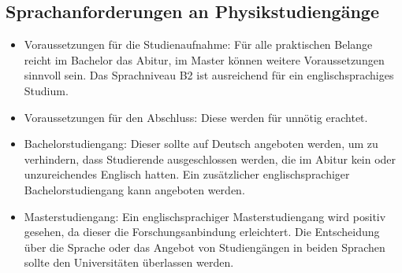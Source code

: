 \documentclass[DIV=calc]{scrartcl}
\begin{document}
\subsection*{Sprachanforderungen an Physikstudiengänge}
\begin{itemize}
    \item Voraussetzungen für die Studienaufnahme: Für alle praktischen Belange reicht im Bachelor das Abitur, im Master können weitere Voraussetzungen sinnvoll sein. Das Sprachniveau B2 ist ausreichend für ein englischsprachiges Studium.
    \item Voraussetzungen für den Abschluss: Diese werden für unnötig erachtet.
    \item Bachelorstudiengang: Dieser sollte auf Deutsch angeboten werden, um zu verhindern, dass Studierende ausgeschlossen werden, die im Abitur kein oder unzureichendes Englisch hatten. Ein zusätzlicher englischsprachiger Bachelorstudiengang kann angeboten werden.
    \item  Masterstudiengang: Ein englischsprachiger Masterstudiengang wird positiv gesehen, da dieser die Forschungsanbindung erleichtert. Die Entscheidung über die Sprache oder das Angebot von Studiengängen in beiden Sprachen sollte den Universitäten überlassen werden.
\end{itemize}
\end{document}
